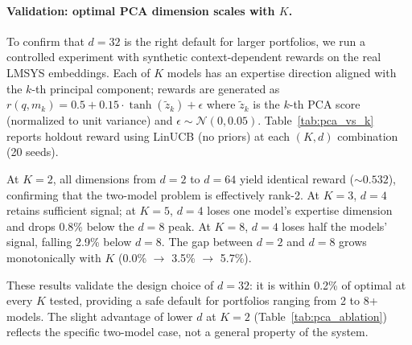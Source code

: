 \paragraph{Validation: optimal PCA dimension scales with $K$.}
To confirm that $d{=}32$ is the right default for larger portfolios,
we run a controlled experiment with synthetic context-dependent rewards
on the real LMSYS embeddings.  Each of $K$ models has an expertise
direction aligned with the $k$-th principal component; rewards are
generated as $r(q, m_k) = 0.5 + 0.15 \cdot \tanh(\tilde{z}_k) + \epsilon$
where $\tilde{z}_k$ is the $k$-th PCA score (normalized to unit variance)
and $\epsilon \sim \mathcal{N}(0, 0.05)$.
Table~\ref{tab:pca_vs_k} reports holdout reward using LinUCB (no priors)
at each $(K, d)$ combination (20 seeds).

\begin{table}[h]
\centering
\caption{PCA dimensionality vs.\ number of models ($K$).
Mean holdout reward, 20 seeds.  Bold = peak at each $K$.
Oracle = best-model-per-prompt upper bound.}
\label{tab:pca_vs_k}
\small
{}
\end{table}

At $K{=}2$, all dimensions from $d{=}2$ to $d{=}64$ yield identical
reward (${\sim}0.532$), confirming that the two-model problem is
effectively rank-2.  At $K{=}3$, $d{=}4$ retains sufficient signal; at $K{=}5$, $d{=}4$ loses one model's expertise
dimension and drops 0.8\% below the $d{=}8$ peak.  At $K{=}8$,
$d{=}4$ loses half the models' signal, falling 2.9\% below $d{=}8$.
The gap between $d{=}2$ and $d{=}8$ grows monotonically with $K$
(0.0\% $\to$ 3.5\% $\to$ 5.7\%).

These results validate the design choice of $d{=}32$: it is within
0.2\% of optimal at every $K$ tested, providing a safe default for
portfolios ranging from 2 to 8+ models.  The slight advantage of lower
$d$ at $K{=}2$ (Table~\ref{tab:pca_ablation}) reflects the specific
two-model case, not a general property of the system.


